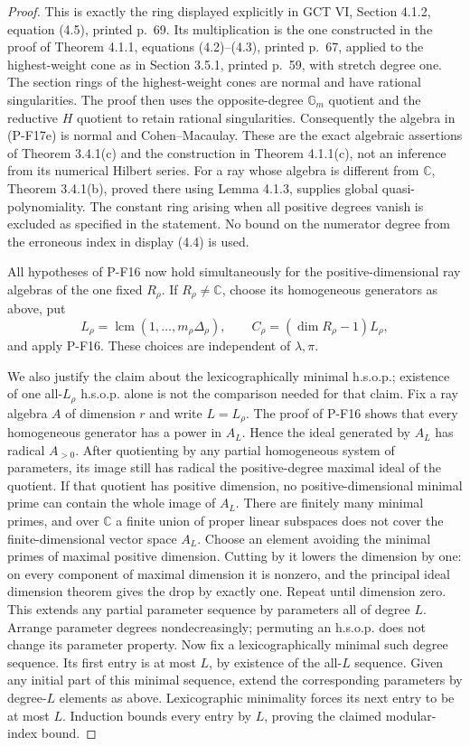 \begin{proof}
This is exactly the ring displayed explicitly in GCT VI,
Section 4.1.2, equation (4.5), printed p.~69. Its multiplication is
the one constructed in the proof of Theorem 4.1.1,
equations (4.2)--(4.3), printed p.~67, applied to the highest-weight
cone as in Section 3.5.1, printed p.~59, with stretch degree one.
The section rings of the highest-weight cones are normal and have
rational singularities. The proof then uses the opposite-degree
$\mathbb G_m$ quotient and the reductive $H$ quotient to retain
rational singularities. Consequently the algebra in (P-F17e) is
normal and Cohen--Macaulay. These are the exact algebraic assertions
of Theorem 3.4.1(c) and the construction in Theorem 4.1.1(c), not an
inference from its numerical Hilbert series. For a ray whose algebra
is different from $\mathbb C$,
Theorem 3.4.1(b), proved there using Lemma 4.1.3, supplies global
quasi-polynomiality. The constant ring arising when all positive
degrees vanish is excluded as specified in the statement. No bound
on the numerator degree from the erroneous index in display (4.4)
is used.

All hypotheses of P-F16 now hold simultaneously for the
positive-dimensional ray algebras of the one fixed $R_\rho$.
If $R_\rho\ne\mathbb C$,
choose its homogeneous generators as above, put
\[
 L_\rho=\operatorname{lcm}(1,\ldots,m_\rho\Delta_\rho),\qquad
 C_\rho=(\dim R_\rho-1)L_\rho,
\]
and apply P-F16. These choices are independent of $\lambda,\pi$.

We also justify the claim about the lexicographically minimal h.s.o.p.;
existence of one all-$L_\rho$ h.s.o.p. alone is not the comparison
needed for that claim. Fix a ray algebra $A$ of dimension $r$ and
write $L=L_\rho$. The proof of P-F16 shows that every homogeneous
generator has a power in $A_L$. Hence the ideal generated by $A_L$
has radical $A_{>0}$. After quotienting by any partial homogeneous
system of parameters, its image still has radical the positive-degree
maximal ideal of the quotient. If that quotient has positive
dimension, no positive-dimensional minimal prime can contain the
whole image of $A_L$. There are finitely many minimal primes, and
over $\mathbb C$ a finite union of proper linear subspaces does not
cover the finite-dimensional vector space $A_L$. Choose an element
avoiding the minimal primes of maximal positive dimension. Cutting
by it lowers the dimension by one: on every component of maximal
dimension it is nonzero, and the principal ideal dimension theorem
gives the drop by exactly one. Repeat until dimension zero. This
extends any partial parameter sequence by parameters all of degree
$L$. Arrange parameter degrees nondecreasingly; permuting an h.s.o.p.
does not change its parameter property. Now fix a lexicographically
minimal such degree sequence. Its first
entry is at most $L$, by existence of the all-$L$ sequence. Given
any initial part of this minimal sequence, extend the corresponding
parameters by degree-$L$ elements as above. Lexicographic minimality
forces its next entry to be at most $L$. Induction bounds every
entry by $L$, proving the claimed modular-index bound.


\end{proof}
